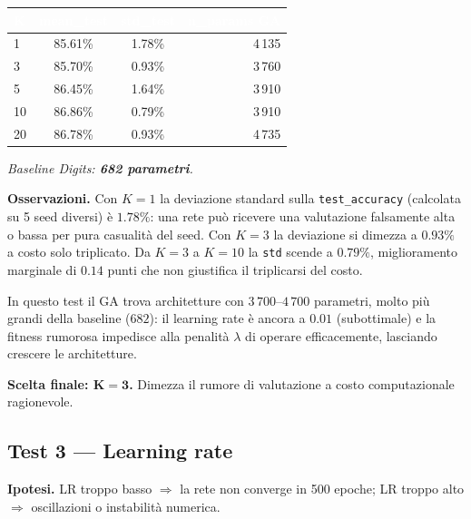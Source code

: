\documentclass[11pt,a4paper]{article}
\begin{document}
\begin{center}
\begin{tabular}{lccr}
    \toprule
    \rowcolor{headerblue}
    \textcolor{white}{\textbf{K}} &
    \textcolor{white}{\textbf{mean\_test}} &
    \textcolor{white}{\textbf{std\_test}} &
    \textcolor{white}{\textbf{n\_params GA}} \\
    \midrule
    1   & 85.61\%   & 1.78\%  & 4\,135 \\
    \rowcolor{rowgray}
    3   & 85.70\%   & 0.93\%  & 3\,760 \\
    5   & 86.45\%   & 1.64\%  & 3\,910 \\
    \rowcolor{rowgray}
    10  & 86.86\%   & 0.79\%  & 3\,910 \\
    20  & 86.78\%   & 0.93\%  & 4\,735 \\
    \bottomrule
\end{tabular}
\end{center}

\textit{Baseline Digits: \textbf{682 parametri}.}

\textbf{Osservazioni.}
Con $K=1$ la deviazione standard sulla \texttt{test\_accuracy} (calcolata
su 5 seed diversi) è $1.78\%$: una rete può ricevere una valutazione
falsamente alta o bassa per pura casualità del seed. Con $K=3$ la
deviazione si dimezza a $0.93\%$ a costo solo triplicato. Da $K=3$ a
$K=10$ la \texttt{std} scende a $0.79\%$, miglioramento marginale di
$0.14$ punti che non giustifica il triplicarsi del costo.

In questo test il GA trova architetture con $3\,700$--$4\,700$ parametri,
molto più grandi della baseline ($682$): il learning rate è ancora a
$0.01$ (subottimale) e la fitness rumorosa impedisce alla penalità
$\lambda$ di operare efficacemente, lasciando crescere le architetture.

\textbf{Scelta finale: $\bm{K=3}$.} Dimezza il rumore di valutazione a
costo computazionale ragionevole.

\subsection{Test 3 — Learning rate}

\textbf{Ipotesi.} LR troppo basso $\Rightarrow$ la rete non converge in
500 epoche; LR troppo alto $\Rightarrow$ oscillazioni o instabilità
numerica.
\end{document}
